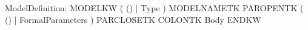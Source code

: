 %
%
%
\begin{rail}
ModelDefinition: MODELKW ( () | Type ) MODELNAMETK PAROPENTK
                 ( () | FormalParameters ) PARCLOSETK COLONTK Body ENDKW
\end{rail}
